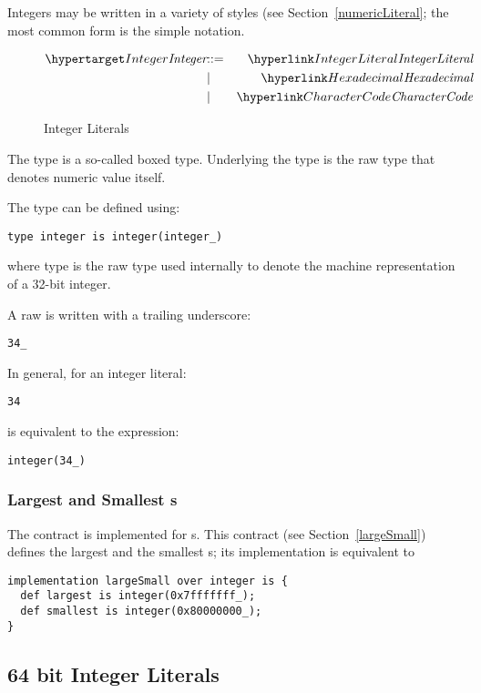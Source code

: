 Integers may be written in a variety of styles (see Section~\vref{numericLiteral}; the most common form is the simple  notation.

\begin{figure}[htbp]
\begin{eqnarray*}
\ntDef{Integer}&\arrow&\ntRef{IntegerLiteral}\\
&\choice&\ntRef{Hexadecimal}\\
&\choice&\ntRef{CharacterCode}
\end{eqnarray*}
\caption{Integer Literals}
\label{integerExpressionFig}
\end{figure}

\noindent
The  type is a so-called boxed type. Underlying the  type is the raw type that denotes numeric value itself. 

The  type can be defined using:
\begin{lstlisting}
type integer is integer(integer_)
\end{lstlisting}
where  type is the raw type used internally to denote the machine representation of a 32-bit integer.
\label{rawInteger}
\begin{aside}
A raw  is written with a trailing underscore:
\begin{lstlisting}
34_
\end{lstlisting}
In general, for an integer literal:
\begin{lstlisting}
34
\end{lstlisting}
is equivalent to the expression:
\begin{lstlisting}
integer(34_)
\end{lstlisting}
\end{aside}

\subsubsection{Largest and Smallest s}
The  contract is implemented for s. This contract (see Section~\vref{largeSmall}) defines the largest and the smallest s; its implementation is equivalent to
\begin{lstlisting}
implementation largeSmall over integer is {
  def largest is integer(0x7fffffff_);
  def smallest is integer(0x80000000_);
}
\end{lstlisting}

\subsection{64 bit Integer Literals}
\label{longType}

